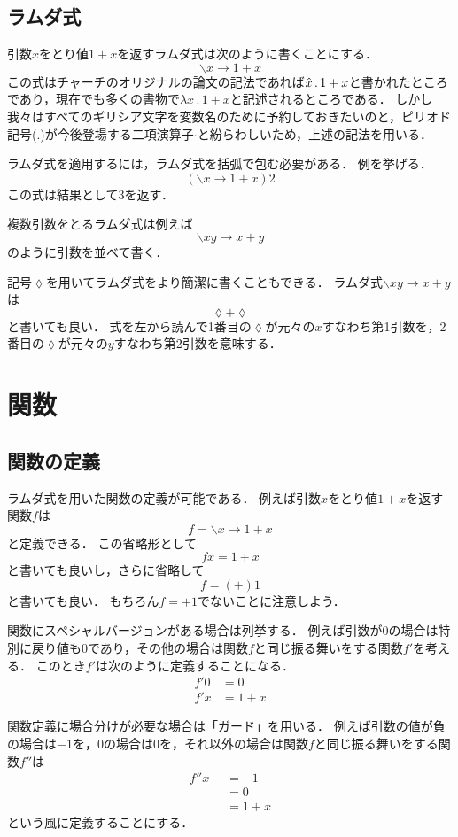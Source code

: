 \documentclass[twocolumn]{jsbook}
\newcommand{\lambdasym}{\backslash}
\newcommand{\lambdadot}{\rightarrow}
\newcommand{\lambdaexp}[2]{\lambdasym#1\lambdadot#2}
\newcommand{\lambdacut}{\lozenge}
\newcommand{\binaryeq}{\equiv}
\newcommand{\binaryl}{<}
\newcommand{\guard}[1]{\mathop{\mid_{#1}}}
\newcommand{\keywordname}[1]{\mathbf{#1}}
\newcommand{\keywordotherwise}{\keywordname{otherwise}}
\begin{document}
\section{ラムダ式}
引数$x$をとり値$1+x$を返すラムダ式は次のように書くことにする．
$$\lambdaexp{x}{1+x}$$
この式はチャーチのオリジナルの論文の記法であれば$\Hat x\,.\,1+x$と書かれたところであり，現在でも多くの書物で$\lambda x\,.\,1+x$と記述されるところである．
しかし我々はすべてのギリシア文字を変数名のために予約しておきたいのと，ピリオド記号($.$)が今後登場する二項演算子$\cdot$と紛らわしいため，上述の記法を用いる．

ラムダ式を適用するには，ラムダ式を括弧で包む必要がある．
例を挙げる．
$$\left(\lambdaexp{x}{1+x}\right)2$$
この式は結果として$3$を返す．

複数引数をとるラムダ式は例えば$$\lambdaexp{xy}{x+y}$$のように引数を並べて書く．

記号$\lambdacut$を用いてラムダ式をより簡潔に書くこともできる．
ラムダ式$\lambdaexp{xy}{x+y}$は$$\lambdacut+\lambdacut$$と書いても良い．
式を左から読んで1番目の$\lambdacut$が元々の$x$すなわち第1引数を，2番目の$\lambdacut$が元々の$y$すなわち第2引数を意味する．

\chapter{関数}

\section{関数の定義}

ラムダ式を用いた関数の定義が可能である．
例えば引数$x$をとり値$1+x$を返す関数$f$は$$f=\lambdaexp{x}{1+x}$$と定義できる．
この省略形として$$fx=1+x$$と書いても良いし，さらに省略して$$f=(+)1$$と書いても良い．
もちろん$f=+1$でないことに注意しよう．

関数にスペシャルバージョンがある場合は列挙する．
例えば引数が$0$の場合は特別に戻り値も$0$であり，その他の場合は関数$f$と同じ振る舞いをする関数$f'$を考える．
このとき$f'$は次のように定義することになる．
\begin{equation*}
\begin{split}
f'0&=0\\
f'x&=1+x
\end{split}
\end{equation*}

関数定義に場合分けが必要な場合は「ガード」を用いる．
例えば引数の値が負の場合は$-1$を，$0$の場合は$0$を，それ以外の場合は関数$f$と同じ振る舞いをする関数$f''$は
\begin{equation*}
\begin{split}
f''x&\guard{x\binaryl0}=-1\\
&\guard{x\binaryeq0}=0\\
&\guard{\keywordotherwise}=1+x
\end{split}
\end{equation*}
という風に定義することにする．
\end{document}
